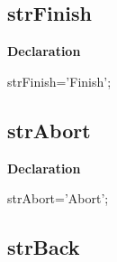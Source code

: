 \documentclass{report}
\newif\ifpdf
\begin{document}
\subsection*{strFinish}
\fi
\label{trstrings-strFinish}
\begin{list}{}{
\setlength{\itemindent}{0cm}
\setlength{\listparindent}{0cm}
\setlength{\leftmargin}{\evensidemargin}
\addtolength{\leftmargin}{\tmplength}
\settowidth{\labelsep}{X}
\addtolength{\leftmargin}{\labelsep}
\setlength{\labelwidth}{\tmplength}
}
\item[\textbf{Declaration}\hfill]
\ifpdf
\begin{flushleft}
\fi
\begin{ttfamily}
strFinish='Finish';\end{ttfamily}

\ifpdf
\end{flushleft}
\fi

\end{list}
\ifpdf
\subsection*{\large{\textbf{strAbort}}\normalsize\hspace{1ex}\hrulefill}
\else
\subsection*{strAbort}
\fi
\label{trstrings-strAbort}
\begin{list}{}{
\setlength{\itemindent}{0cm}
\setlength{\listparindent}{0cm}
\setlength{\leftmargin}{\evensidemargin}
\addtolength{\leftmargin}{\tmplength}
\settowidth{\labelsep}{X}
\addtolength{\leftmargin}{\labelsep}
\setlength{\labelwidth}{\tmplength}
}
\item[\textbf{Declaration}\hfill]
\ifpdf
\begin{flushleft}
\fi
\begin{ttfamily}
strAbort='Abort';\end{ttfamily}

\ifpdf
\end{flushleft}
\fi

\end{list}
\ifpdf
\subsection*{\large{\textbf{strBack}}\normalsize\hspace{1ex}\hrulefill}
\else
\end{document}

